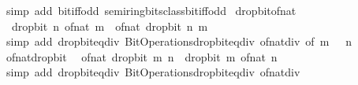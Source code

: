 \begin{isabellebody}
\ {\isacharparenleft}{\kern0pt}simp\ add{\isacharcolon}{\kern0pt}\ bit{\isacharunderscore}{\kern0pt}iff{\isacharunderscore}{\kern0pt}odd\ semiring{\isacharunderscore}{\kern0pt}bits{\isacharunderscore}{\kern0pt}class{\isachardot}{\kern0pt}bit{\isacharunderscore}{\kern0pt}iff{\isacharunderscore}{\kern0pt}odd{\isacharparenright}{\kern0pt}\isanewline
{}\isamarkupfalse%
%
\endisatagproof
{\isafoldproof}%
%
\isadelimproof
\isanewline
%
\endisadelimproof
\isanewline
{}\isamarkupfalse%
\ drop{\isacharunderscore}{\kern0pt}bit{\isacharunderscore}{\kern0pt}of{\isacharunderscore}{\kern0pt}nat{\isacharcolon}{\kern0pt}\isanewline
\ \ {\isachardoublequoteopen}drop{\isacharunderscore}{\kern0pt}bit\ n\ {\isacharparenleft}{\kern0pt}of{\isacharunderscore}{\kern0pt}nat\ m{\isacharparenright}{\kern0pt}\ {\isacharequal}{\kern0pt}\ of{\isacharunderscore}{\kern0pt}nat\ {\isacharparenleft}{\kern0pt}drop{\isacharunderscore}{\kern0pt}bit\ n\ m{\isacharparenright}{\kern0pt}{\isachardoublequoteclose}\isanewline
%
\isadelimproof
\ \ %
\endisadelimproof
%
\isatagproof
{}\isamarkupfalse%
\ {\isacharparenleft}{\kern0pt}simp\ add{\isacharcolon}{\kern0pt}\ drop{\isacharunderscore}{\kern0pt}bit{\isacharunderscore}{\kern0pt}eq{\isacharunderscore}{\kern0pt}div\ Bit{\isacharunderscore}{\kern0pt}Operations{\isachardot}{\kern0pt}drop{\isacharunderscore}{\kern0pt}bit{\isacharunderscore}{\kern0pt}eq{\isacharunderscore}{\kern0pt}div\ of{\isacharunderscore}{\kern0pt}nat{\isacharunderscore}{\kern0pt}div\ {\isacharbrackleft}{\kern0pt}of\ m\ {\isachardoublequoteopen}{}\ {\isacharcircum}{\kern0pt}\ n{\isachardoublequoteclose}{\isacharbrackright}{\kern0pt}{\isacharparenright}{\kern0pt}%
\endisatagproof
{\isafoldproof}%
%
\isadelimproof
\isanewline
%
\endisadelimproof
\isanewline
{}\isamarkupfalse%
\ of{\isacharunderscore}{\kern0pt}nat{\isacharunderscore}{\kern0pt}drop{\isacharunderscore}{\kern0pt}bit{\isacharcolon}{\kern0pt}\isanewline
\ \ {\isacartoucheopen}of{\isacharunderscore}{\kern0pt}nat\ {\isacharparenleft}{\kern0pt}drop{\isacharunderscore}{\kern0pt}bit\ m\ n{\isacharparenright}{\kern0pt}\ {\isacharequal}{\kern0pt}\ drop{\isacharunderscore}{\kern0pt}bit\ m\ {\isacharparenleft}{\kern0pt}of{\isacharunderscore}{\kern0pt}nat\ n{\isacharparenright}{\kern0pt}{\isacartoucheclose}\isanewline
%
\isadelimproof
\ \ %
\endisadelimproof
%
\isatagproof
{}\isamarkupfalse%
\ {\isacharparenleft}{\kern0pt}simp\ add{\isacharcolon}{\kern0pt}\ drop{\isacharunderscore}{\kern0pt}bit{\isacharunderscore}{\kern0pt}eq{\isacharunderscore}{\kern0pt}div\ Bit{\isacharunderscore}{\kern0pt}Operations{\isachardot}{\kern0pt}drop{\isacharunderscore}{\kern0pt}bit{\isacharunderscore}{\kern0pt}eq{\isacharunderscore}{\kern0pt}div\ of{\isacharunderscore}{\kern0pt}nat{\isacharunderscore}{\kern0pt}div{\isacharparenright}{\kern0pt}%

\end{isabellebody}
